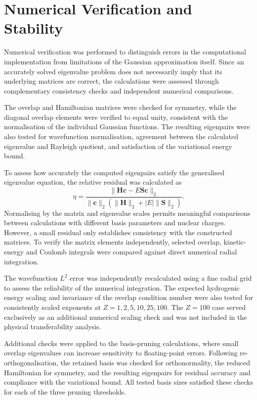 \newpage
\section{Numerical Verification and Stability}

Numerical verification was performed to distinguish errors in the computational implementation from limitations of the Gaussian approximation itself. Since an accurately solved eigenvalue problem does not necessarily imply that its underlying matrices are correct, the calculations were assessed through complementary consistency checks and independent numerical comparisons.

The overlap and Hamiltonian matrices were checked for symmetry, while the diagonal overlap elements were verified to equal unity, consistent with the normalisation of the individual Gaussian functions. The resulting eigenpairs were also tested for wavefunction normalisation, agreement between the calculated eigenvalue and Rayleigh quotient, and satisfaction of the variational energy bound.

To assess how accurately the computed eigenpairs satisfy the generalised eigenvalue equation, the relative residual was calculated as
\begin{equation}
    \eta =
    \frac{
        \|\mathbf H\mathbf c-E\mathbf S\mathbf c\|_2
    }{
        \|\mathbf c\|_2
        \left(
            \|\mathbf H\|_2
            +|E|\|\mathbf S\|_2
        \right)
    }.
    \label{eq:relative_residual}
\end{equation}
Normalising by the matrix and eigenvalue scales permits meaningful comparisons between calculations with different basis parameters and nuclear charges. However, a small residual only establishes consistency with the constructed matrices. To verify the matrix elements independently, selected overlap, kinetic-energy and Coulomb integrals were compared against direct numerical radial integration.

The wavefunction $L^2$ error was independently recalculated using a fine radial grid to assess the reliability of the numerical integration. The expected hydrogenic energy scaling and invariance of the overlap condition number were also tested for consistently scaled exponents at $Z=1,2,5,10,25,100$. The $Z=100$ case served exclusively as an additional numerical scaling check and was not included in the physical transferability analysis.

Additional checks were applied to the basis-pruning calculations, where small overlap eigenvalues can increase sensitivity to floating-point errors. Following re-orthogonalisation, the retained basis was checked for orthonormality, the reduced Hamiltonian for symmetry, and the resulting eigenpairs for residual accuracy and compliance with the variational bound. All tested basis sizes satisfied these checks for each of the three pruning thresholds.

